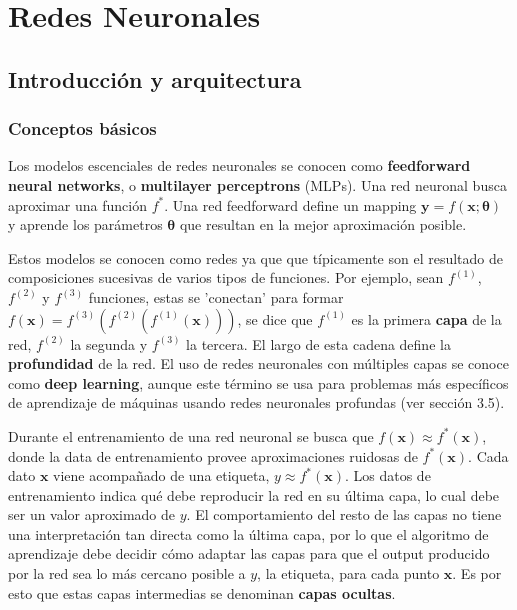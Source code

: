 
\newpage
\section{Redes Neuronales}

\subsection{Introducción y arquitectura}

\subsubsection{Conceptos básicos}

Los modelos escenciales de redes neuronales se conocen como \textbf{feedforward neural networks}, o \textbf{multilayer perceptrons} (MLPs). Una red neuronal busca aproximar una funci\'on $f^*$. Una red feedforward define un mapping $\bm{y}=f(\bm{x}; \bm{\theta})$ y aprende los par\'ametros $\bm{\theta}$ que resultan en la mejor aproximaci\'on posible.

Estos modelos se conocen como redes ya que que t\'ipicamente son el resultado de composiciones sucesivas de varios tipos de funciones. Por ejemplo, sean $f^{(1)}$, $f^{(2)}$ y $f^{(3)}$ funciones, estas se 'conectan' para formar $f(\bm{x}) = f^{(3)}(f^{(2)}(f^{(1)}(\bm{x})))$, se dice que $f^{(1)}$ es la primera \textbf{capa} de la red, $f^{(2)}$ la segunda y $f^{(3)}$ la tercera. El largo de esta cadena define la \textbf{profundidad} de la red. El uso de redes neuronales con m\'ultiples capas se conoce como \textbf{deep learning}, aunque este t\'ermino se usa para problemas m\'as espec\'ificos de aprendizaje de m\'aquinas usando redes neuronales profundas (ver secci\'on 3.5).

Durante el entrenamiento de una red neuronal se busca que $f(\bm{x}) \approx f^*(\bm{x})$, donde la data de entrenamiento provee aproximaciones ruidosas de $f^*(\bm{x})$. Cada dato $\bm{x}$ viene acompa{\~{n}}ado de una etiqueta, $y \approx f^*(\bm{x})$. Los datos de entrenamiento indica qu\'e debe reproducir la red en su \'ultima capa, lo cual debe ser un valor aproximado de $y$. El comportamiento del resto de las capas no tiene una interpretación tan directa como la última capa, por lo que el algoritmo de aprendizaje debe decidir c\'omo adaptar las capas para que el output producido por la red sea lo m\'as cercano posible a $y$, la etiqueta, para cada punto $\bm{x}$. Es por esto que estas capas intermedias se denominan \textbf{capas ocultas}.

